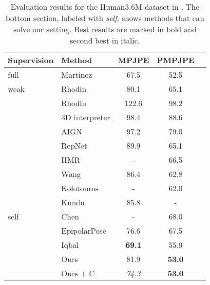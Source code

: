 \documentclass[final]{cvpr}
\begin{document}
\begin{table}[htp]
	\footnotesize
    \caption{Evaluation results for the Human3.6M dataset in . The bottom section, labeled with \textit{self}, shows methods that can solve our setting. Best results are marked in bold and second best in italic.}
	\centering
    \begin{tabular}{ l | l | c c c }
        Supervision & Method & MPJPE & PMPJPE \\
        \hline
        full                        & Martinez \cite{martinez_2017_3Dbaseline}  & 67.5 & 52.5\\
        \hline
        weak                        & Rhodin \cite{rhodin2018learning}          & 80.1  & 65.1 \\
                                    & Rhodin \cite{rhodin2018unsupervised}      & 122.6 & 98.2 \\
                                    & 3D interpreter \cite{3Dinterpreter2016}   & 98.4  & 88.6 \\
                                    & AIGN \cite{AIGN2017}                      & 97.2  & 79.0 \\
                                    & RepNet \cite{WanRos2019a}                 & 89.9  & 65.1 \\
                                    & HMR \cite{Kanazawa:CVPR:2018}             & -     & 66.5 \\
                                    & Wang \cite{Wang_2019_ICCV}                & 86.4  & 62.8 \\
                                    & Kolotouros \cite{SPIN:ICCV:2019}          & -     & 62.0 \\
                                    & Kundu \cite{Kundu_2020_CVPR}              & 85.8  & -    \\
                                    
        \hline
        \hline
        self
                                    & Chen \cite{chen2019unsupervised}               & -     & 68.0 \\
                                    & EpipolarPose \cite{kocabas2019epipolar}  & 76.6  & 67.5\\
                                    & Iqbal \cite{Iqbal_2020_CVPR}             & \textbf{69.1}  & 55.9 \\
        \hline
                                    & Ours                                      & 81.9  & \textbf{53.0}  \\
                                    & Ours + C                                  & \textit{74.3}  & \textbf{53.0} \\
    \end{tabular}
    \label{tab:eval_h36m}
\end{table}
\end{document}
